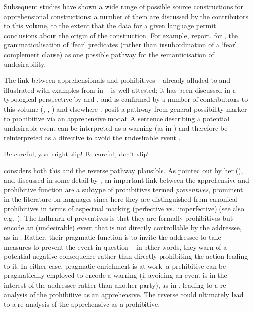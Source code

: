 \documentclass[output=paper,colorlinks,citecolor=brown]{langscibook}
\begin{document}
Subsequent studies have shown a wide range of possible source constructions for apprehensional constructions; a number of them are discussed by the contributors to this volume, to the extent that the data for a given language permit conclusions about the origin of the construction. For example, \citet{chapters/rhee-kuteva} report, for , the grammaticalisation of `fear' predicates (rather than insubordination of a `fear' complement clause) as one possible pathway for the semanticisation of undesirability.

The link between apprehensionals and prohibitives -- already alluded to and illustrated with examples from  in  -- is well attested; it has been discussed in a typological perspective by \citet[50--63]{Dobrushina2006} and \citet{pakendorfschalley2007}, and is confirmed by a number of contributions to this volume (\citeauthor{chapters/lahaussois}, \citeauthor{chapters/treis}, \citeauthor{chapters/wiemer}) and elsewhere \citep{smithdennis2021}. \citet{pakendorfschalley2007} posit a pathway from general possibility marker to prohibitive via an apprehensive modal: A sentence describing a potential undesirable event can be interpreted as a warning (as in ) and therefore be reinterpreted as a directive to avoid the undesirable event .


\ea\label{ex:intro25}
\ea\label{ex:intro25a} {\op}Be careful,{\cp} you might slip!
\ex\label{ex:intro25b} {\op}Be careful,{\cp} don't slip!
\z
\z

 \citet[62]{Dobrushina2006} considers both this and the reverse pathway plausible. As pointed out by her (\citeyear[61--63]{Dobrushina2006}), and discussed in some detail by \citet{chapters/wiemer}, an important link between the apprehensive and prohibitive function are a subtype of prohibitives termed \textit{preventives}, prominent in the literature on  languages since here they are distinguished from canonical prohibitives in terms of aspectual marking (perfective vs.\ imperfective) (see also e.g.\ \cite{Xrakovskij1990,kuehnast2008}). The hallmark of preventives is that they are formally prohibitives but encode an (undesirable) event that is not directly controllable by the addressee, as in . Rather, their pragmatic function is to invite the addressee to take measures to prevent the event in question -- in other words, they warn of a potential negative consequence rather than directly prohibiting the action leading to it. In either case, pragmatic enrichment is at work: a prohibitive can be pragmatically employed to encode a warning (if avoiding an event is in the interest of the addressee rather than another party), as in , leading to a re-analysis of the prohibitive as an apprehensive. The reverse could ultimately lead to a re-analysis of the apprehensive as a prohibitive. 
\end{document}
